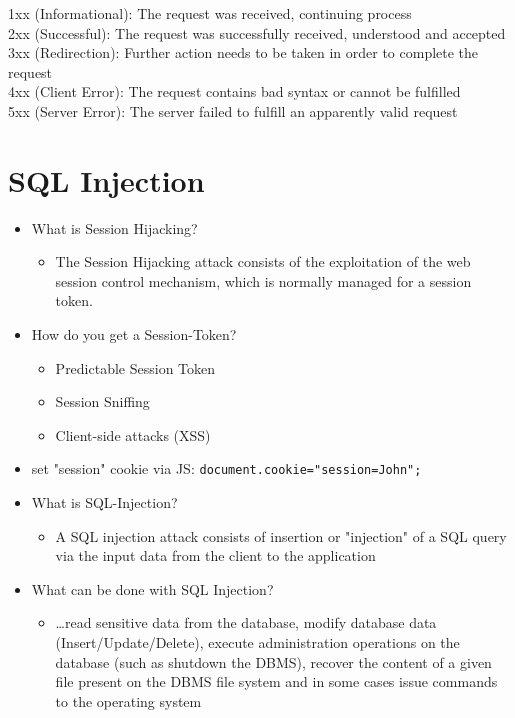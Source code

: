 \documentclass[11pt]{article}
\begin{document}
1xx (Informational): The request was received, continuing process\\
2xx (Successful): The request was successfully received, understood and accepted\\
3xx (Redirection): Further action needs to be taken in order to complete the request\\
4xx (Client Error): The request contains bad syntax or cannot be fulfilled\\
5xx (Server Error): The server failed to fulfill an apparently valid request\\
\section{SQL Injection}
\label{sec:orgca66d95}
\begin{itemize}
\item What is Session Hijacking?
\begin{itemize}
\item The Session Hijacking attack consists of the exploitation of the web session control mechanism, which is normally managed for a session token.
\end{itemize}
\item How do you get a Session-Token?
\begin{itemize}
\item Predictable Session Token
\item Session Sniffing
\item Client-side attacks (XSS)
\end{itemize}
\item set "session" cookie via JS: \texttt{document.cookie="session=John";}
\item What is SQL-Injection?
\begin{itemize}
\item A SQL injection attack consists of insertion or "injection" of a SQL query via the input data from the client to the application
\end{itemize}
\item What can be done with SQL Injection?
\begin{itemize}
\item …read sensitive data from the database, modify database data (Insert/Update/Delete), execute administration operations on the database (such as shutdown the DBMS), recover the content of a given file present on the DBMS file system and in some cases issue commands to the operating system
\end{itemize}

\end{itemize}
\end{document}
